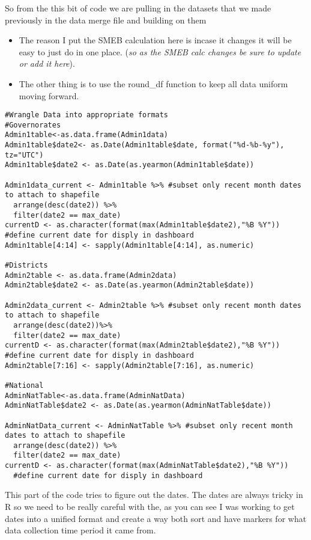 \documentclass[
]{article}
\providecommand{\tightlist}{%
  \setlength{\itemsep}{0pt}\setlength{\parskip}{0pt}}
\begin{document}
So from the this bit of code we are pulling in the datasets that we made
previously in the data merge file and building on them

\begin{itemize}
\tightlist
\item
  The reason I put the SMEB calculation here is incase it changes it
  will be easy to just do in one place. (\emph{so as the SMEB calc
  changes be sure to update or add it here}).
\item
  The other thing is to use the round\_df function to keep all data
  uniform moving forward.
\end{itemize}

\begin{verbatim}
#Wrangle Data into appropriate formats
#Governorates
Admin1table<-as.data.frame(Admin1data)
Admin1table$date2<- as.Date(Admin1table$date, format("%d-%b-%y"), tz="UTC")
Admin1table$date2 <- as.Date(as.yearmon(Admin1table$date))

Admin1data_current <- Admin1table %>% #subset only recent month dates to attach to shapefile
  arrange(desc(date2)) %>%
  filter(date2 == max_date)
currentD <- as.character(format(max(Admin1table$date2),"%B %Y")) #define current date for disply in dashboard
Admin1table[4:14] <- sapply(Admin1table[4:14], as.numeric)

#Districts
Admin2table <- as.data.frame(Admin2data)
Admin2table$date2 <- as.Date(as.yearmon(Admin2table$date))

Admin2data_current <- Admin2table %>% #subset only recent month dates to attach to shapefile
  arrange(desc(date2))%>%
  filter(date2 == max_date)
currentD <- as.character(format(max(Admin2table$date2),"%B %Y")) #define current date for disply in dashboard
Admin2table[7:16] <- sapply(Admin2table[7:16], as.numeric)

#National
AdminNatTable<-as.data.frame(AdminNatData)
AdminNatTable$date2 <- as.Date(as.yearmon(AdminNatTable$date))

AdminNatData_current <- AdminNatTable %>% #subset only recent month dates to attach to shapefile
  arrange(desc(date2)) %>%
  filter(date2 == max_date)
currentD <- as.character(format(max(AdminNatTable$date2),"%B %Y"))
  #define current date for disply in dashboard
\end{verbatim}

This part of the code tries to figure out the dates. The dates are
always tricky in R so we need to be really careful with the, as you can
see I was working to get dates into a unified format and create a way
both sort and have markers for what data collection time period it came
from.
\end{document}
